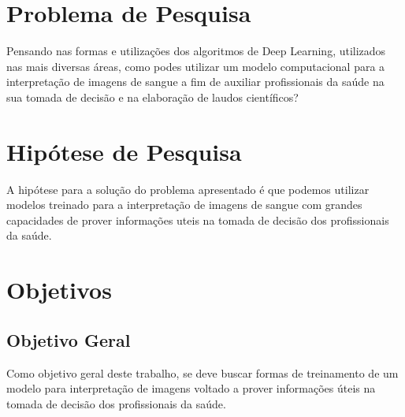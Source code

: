 \section{Problema de Pesquisa}
\label{sec:problema}

Pensando nas formas e utilizações dos algoritmos de Deep Learning, utilizados nas mais diversas áreas, como podes utilizar um modelo computacional para a interpretação de imagens de sangue a fim de auxiliar profissionais da saúde na sua tomada de decisão e na elaboração de laudos científicos?


\section{Hipótese de Pesquisa}
\label{sec:hipotese}
A hipótese para a solução do problema apresentado é que podemos utilizar modelos treinado para a interpretação de imagens de sangue com grandes capacidades de prover informações uteis na tomada de decisão dos profissionais da saúde.


\section{Objetivos}
\label{sec:objetivos}

\subsection{Objetivo Geral}
Como objetivo geral deste trabalho, se deve buscar formas de treinamento de um modelo para interpretação de imagens voltado a prover informações úteis na tomada de decisão dos profissionais da saúde.

